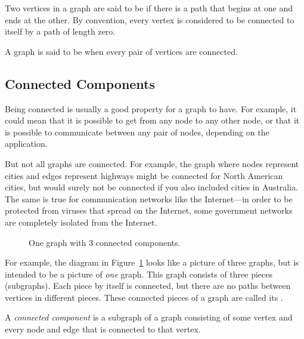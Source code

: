 \begin{definition}
  Two vertices in a graph are said to be  if there
  is a path that begins at one and ends at the other.  By convention,
  every vertex is considered to be connected to itself by a path of
  length zero.
\end{definition}

\begin{definition}\label{def:connected-graph}
A graph is said to be  when every pair of vertices are
connected.
\end{definition}

\subsection{Connected Components}

Being connected is usually a good property for a graph to have.  For
example, it could mean that it is possible to get from any node to any
other node, or that it is possible to communicate between any pair of
nodes, depending on the application.

But not all graphs are connected.  For example, the graph where nodes
represent cities and edges represent highways might be connected for
North American cities, but would surely not be connected if you also
included cities in Australia.  The same is true for communication
networks like the Internet---in order to be protected from viruses
that spread on the Internet, some government networks are completely
isolated from the Internet.

\begin{figure}[htbp]


\caption{One graph with 3 connected components.}

\label{fig:3comp}
\end{figure}

For example, the diagram in Figure~\ref{fig:3comp} looks like a
picture of three graphs, but is intended to be a picture of \emph{one}
graph.  This graph consists of three pieces (subgraphs).  Each piece
by itself is connected, but there are no paths between vertices in
different pieces.  These connected pieces of a graph are called its
.

\begin{definition}\label{def:connected-component}
A \emph{connected component} is a subgraph of a graph consisting of
some vertex and every node and edge that is connected to that vertex.
\end{definition}


